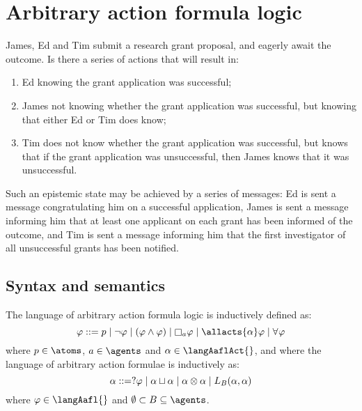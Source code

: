 \chapter{Arbitrary action formula logic}\label{aafl}

\begin{example}\label{grant-example}
James, Ed and Tim submit a research grant proposal, and eagerly await the outcome.
Is there a series of actions that will result in: 

\begin{enumerate}
  \item Ed knowing the grant application was successful; 
  \item James not knowing whether the grant application was successful, but knowing that either Ed or Tim does know;
  \item Tim does not know whether the grant application was successful, but knows that if the grant application was unsuccessful, then James knows that it was unsuccessful.
\end{enumerate}

Such an epistemic state may be achieved by a series of messages: Ed is sent a message congratulating him on a successful application, James is sent a message informing him that at least one applicant on each grant has been informed of the outcome, and Tim is sent a message informing him that the first investigator of all unsuccessful grants has been notified.
\end{example}

\section{Syntax and semantics}\label{aafl-semantics}

\begin{definition}
The language \langAafl{} of arbitrary action formula logic is inductively defined as:
$$
    \phi ::= \atomP \mid 
           \neg \phi \mid
           (\phi \land \phi) \mid
           \necessaryA \phi \mid
           \allacts{\alpha} \phi \mid
           \allrefs \phi
$$
where $\atomP \in \atoms$, $\agentA \in \agents$ and $\alpha \in \langAaflAct{}$, and where the language \langAaflAct{} of arbitrary action formulae is inductively as:
$$
    \alpha ::= ?{\varphi} \mid
           \alpha \sqcup \alpha \mid
           \alpha \otimes \alpha \mid
           L_B (\alpha, \alpha)
$$
where $\phi \in \langAafl{}$ and $\emptyset \subset \agentsB \subseteq \agents$.
\end{definition}

